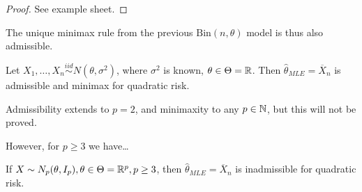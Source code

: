 \documentclass[a4paper]{article}
\begin{document}
\begin{proof}
	See example sheet.
\end{proof}

\begin{remark}
	The unique minimax rule from the previous $\text{Bin}(n, \theta)$ model is thus also admissible.
\end{remark}

\begin{thm}
	Let $X_1, \ldots, X_n \stackrel{iid}{\sim} N(\theta, \sigma^2)$, where  $\sigma^2$ is known, $\theta \in \Theta = \mathbb{R}$. Then $\hat{\theta}_{MLE} = \overline{X}_n$ is admissible and minimax for quadratic risk.
\end{thm}

\begin{remark}
	Admissibility extends to $p=2$, and minimaxity to any $p \in \mathbb{N}$, but this will not be proved.
\end{remark}

However, for $p\ge 3$ we have\ldots

\begin{thm}
	If $X \sim N_p(\theta, I_p), \theta \in \Theta = \mathbb{R}^{p}, p\ge 3$, then $\hat{\theta}_{MLE} = \overline{X}_n$ is inadmissible for quadratic risk. 	
\end{thm}
\end{document}
